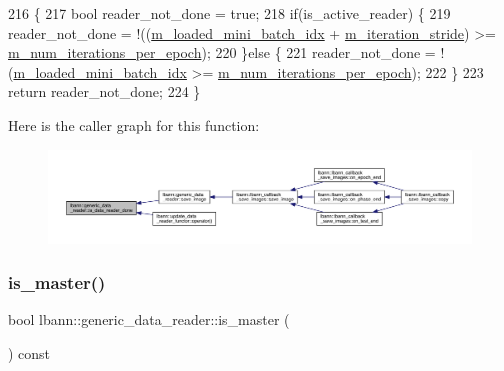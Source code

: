 \begin{DoxyCode}
216                                                                    \{
217   \textcolor{keywordtype}{bool} reader\_not\_done = \textcolor{keyword}{true};
218   \textcolor{keywordflow}{if}(is\_active\_reader) \{
219     reader\_not\_done = !((\hyperlink{classlbann_1_1generic__data__reader_a2cfc5a3e6de8a8a24d3525ec3ed586fb}{m\_loaded\_mini\_batch\_idx} + 
      \hyperlink{classlbann_1_1generic__data__reader_a73b23a2e7768db4e9e8ba4d9a362163a}{m\_iteration\_stride}) >= \hyperlink{classlbann_1_1generic__data__reader_ab570063483a1f604ca2fc536c3d83de7}{m\_num\_iterations\_per\_epoch});
220   \}\textcolor{keywordflow}{else} \{
221     reader\_not\_done = !(\hyperlink{classlbann_1_1generic__data__reader_a2cfc5a3e6de8a8a24d3525ec3ed586fb}{m\_loaded\_mini\_batch\_idx} >= 
      \hyperlink{classlbann_1_1generic__data__reader_ab570063483a1f604ca2fc536c3d83de7}{m\_num\_iterations\_per\_epoch});
222   \}
223   \textcolor{keywordflow}{return} reader\_not\_done;
224 \}
\end{DoxyCode}
Here is the caller graph for this function\+:\nopagebreak
\begin{figure}[H]
\begin{center}
\leavevmode
\includegraphics[width=350pt]{classlbann_1_1generic__data__reader_a8640edf9c71e3b7bee8a8e947c4690fa_icgraph}
\end{center}
\end{figure}
\mbox{\label{classlbann_1_1generic__data__reader_ae82c40eebc05e2f0c1198afcc7a7f009}} 
\subsubsection{\texorpdfstring{is\+\_\+master()}{is\_master()}}
{\footnotesize\ttfamily bool lbann\+::generic\+\_\+data\+\_\+reader\+::is\+\_\+master (\begin{DoxyParamCaption}{ }\end{DoxyParamCaption}) const\hspace{0.3cm}{\ttfamily [inline]}}



